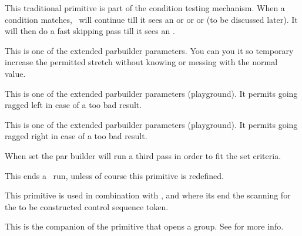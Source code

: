 This traditional primitive is part of the condition testing mechanism. When a
condition matches, \TEX\ will continue till it sees an  or \prm
{or} or  (to be discussed later). It will then do a fast skipping
pass till it sees an .

\stopoldprimitive

\startoldprimitive[title={\prm {emergencyextrastretch}}]

This is one of the extended parbuilder parameters. You can you it so temporary
increase the permitted stretch without knowing or messing with the normal value.

\stopoldprimitive

\startnewprimitive[title={\prm {emergencyleftskip}}]

This is one of the extended parbuilder parameters (playground). It permits going
ragged left in case of a too bad result.

\stopnewprimitive

\startnewprimitive[title={\prm {emergencyrightskip}}]

This is one of the extended parbuilder parameters (playground). It permits going
ragged right in case of a too bad result.

\stopnewprimitive

\startoldprimitive[title={\prm {emergencystretch}}]

When set the par builder will run a third pass in order to fit the set criteria.

\stopoldprimitive

\startoldprimitive[title={\prm {end}}]

This ends a \TEX\ run, unless of course this primitive is redefined.

\stopoldprimitive

\startoldprimitive[title={\prm {endcsname}}]

This primitive is used in combination with ,  and
 where its end the scanning for the to be constructed control
sequence token.

\stopoldprimitive

\startoldprimitive[title={\prm {endgroup}}]

This is the companion of the  primitive that opens a group. See
 for more info.

\stopoldprimitive

\startoldprimitive[title={\prm {endinput}}]


